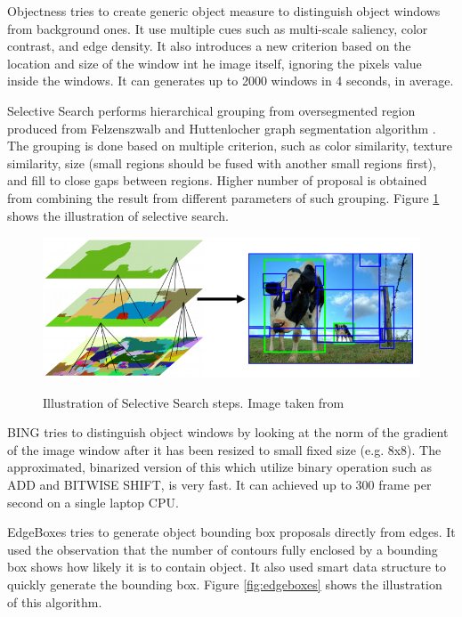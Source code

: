 \documentclass[a4paper,11pt]{kth-mag}
\begin{document}
Objectness \cite{alexe2012objectness} tries to create generic object measure to distinguish object windows from background ones. It use multiple cues such as multi-scale saliency, color contrast, and edge density. It also introduces a new criterion based on the location and size of the window int he image itself, ignoring the pixels value inside the windows. It can generates up to 2000 windows in 4 seconds, in average.

Selective Search \cite{selectivesearch} performs hierarchical grouping from oversegmented region produced from Felzenszwalb and Huttenlocher graph segmentation algorithm \cite{felzenszwalb}. The grouping is done based on multiple criterion, such as color similarity, texture similarity, size (small regions should be fused with another small regions first), and fill to close gaps between regions. Higher number of proposal is obtained from combining the result from different parameters of such grouping. Figure \ref{fig:selective_search} shows the illustration of selective search.

\begin{figure}[h]
\centering
\includegraphics[scale=0.5]{image/selective_search.png}
\label{fig:selective_search}
\caption{Illustration of Selective Search steps. Image taken from \cite{uijlings2014selective}}
\end{figure}

BING \cite{bing} tries to distinguish object windows by looking at the norm of the gradient of the image window after it has been resized to small fixed size (e.g. 8x8). The approximated, binarized version of this which utilize binary operation such as ADD and BITWISE SHIFT, is very fast. It can achieved up to 300 frame per second on a single laptop CPU.

EdgeBoxes \cite{zitnick2014edgeboxes} tries to generate object bounding box proposals directly from edges. It used the observation that the number of contours fully enclosed by a bounding box shows how likely it is to contain object. It also used smart data structure to quickly generate the bounding box. Figure \ref{fig:edgeboxes} shows the illustration of this algorithm.
\end{document}
